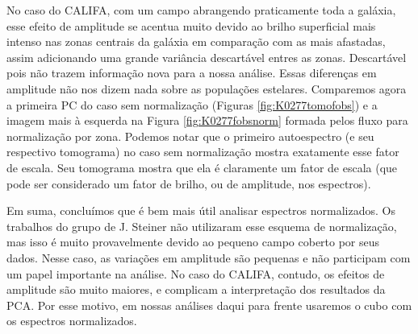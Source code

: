 No caso do CALIFA, com um campo abrangendo praticamente toda a galáxia, esse efeito de amplitude se acentua muito devido
ao brilho superficial mais intenso nas zonas centrais da galáxia em comparação com as mais afastadas, assim adicionando
uma grande variância descartável entres as zonas. Descartável pois não trazem informação nova para a nossa análise.
Essas diferenças em amplitude não nos dizem nada sobre as populações estelares. Comparemos agora a primeira PC do caso
sem normalização (Figuras \ref{fig:K0277tomofobs}) e a imagem mais à esquerda na Figura \ref{fig:K0277fobsnorm} formada
pelos fluxo para normalização por zona. Podemos notar que o primeiro autoespectro (e seu respectivo tomograma) no caso
sem normalização mostra exatamente esse fator de escala. Seu tomograma mostra que ela é claramente um fator de escala
(que pode ser considerado um fator de brilho, ou de amplitude, nos espectros).

Em suma, concluímos que é bem mais útil analisar espectros normalizados. Os trabalhos do grupo de J. Steiner não
utilizaram esse esquema de normalização, mas isso é muito provavelmente devido ao pequeno campo coberto por seus dados.
Nesse caso, as variações em amplitude são pequenas e não participam com um papel importante na análise. No caso do
CALIFA, contudo, os efeitos de amplitude são muito maiores, e complicam a interpretação dos resultados da PCA. Por esse
motivo, em nossas análises daqui para frente usaremos o cubo com os espectros normalizados.

